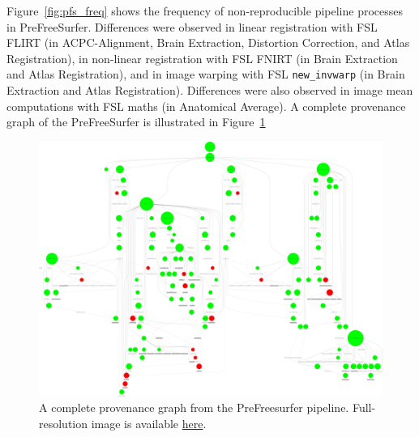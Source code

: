 \documentclass[a4paper,num-refs]{oup-contemporary}
\begin{document}
Figure~\ref{fig:pfs_freq} shows the frequency of non-reproducible pipeline processes
in PreFreeSurfer. 
Differences were observed in linear registration 
with FSL FLIRT (in ACPC-Alignment, Brain Extraction, Distortion Correction, and
Atlas Registration), in non-linear registration with FSL FNIRT (in Brain Extraction 
and Atlas Registration), and in image warping with FSL \texttt{new\_invwarp} (in Brain Extraction 
and Atlas Registration). Differences were also observed in image mean 
computations with FSL maths  (in Anatomical Average). 
A complete provenance graph of the PreFreeSurfer is illustrated in Figure~\ref{fig:complete_pfs}
\begin{figure}
  \centering
    \includegraphics[width=\columnwidth]{images/pfs-labeled.png} 
    \caption{A complete provenance graph from the PreFreesurfer pipeline.
     Full-resolution image is available 
     \href{https://drive.google.com/file/d/1BKq5ZXIVr3bkij88SmeW7ulWOExSCm7n/view?usp=sharing}{here}.}
    \label{fig:complete_pfs}
\end{figure}
\end{document}
